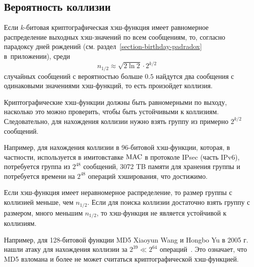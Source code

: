 \subsection{Вероятность коллизии}

Если $k$-битовая криптографическая хэш-функция имеет равномерное распределение выходных хэш-значений по всем сообщениям, то, согласно парадоксу дней рождений (см. раздел~\ref{section-birthday-padradox} в~приложении), среди
    \[ n_{1/2} \approx \sqrt{2 \ln 2} \cdot 2^{k/2} \]
случайных сообщений с вероятностью больше $0.5$ найдутся два сообщения с одинаковыми значениями хэш-функций, то есть произойдет коллизия.

Криптографические хэш-функции должны быть равномерными по выходу, насколько это можно проверить, чтобы быть устойчивыми к коллизиям. Следовательно, для нахождения коллизии нужно взять группу из примерно $2^{k/2}$ сообщений.

Например, для нахождения коллизии в 96-битовой хэш-функции, которая, в частности, используется в имитовставке $\textrm{MAC}$ в протоколе IPsec (часть IPv6), потребуется группа из $2^{48}$ сообщений, 3072 TB памяти для хранения группы и потребуется времени на $2^{48}$ операций хэширования, что достижимо.

Если хэш-функция имеет неравномерное распределение, то размер группы с коллизией меньше, чем $n_{1/2}$. Если для поиска коллизии достаточно взять группу с размером, много меньшим $n_{1/2}$, то хэш-функция не является устойчивой к коллизиям.

Например, для 128-битовой функции MD5 Xiaoyun Wang и Hongbo Yu в 2005 г. нашли атаку для нахождения коллизии за $2^{39} \ll 2^{64}$ операций~\cite{WangYu:2005}. Это означает, что MD5 взломана и более не может считаться криптографической хэш-функцией.
